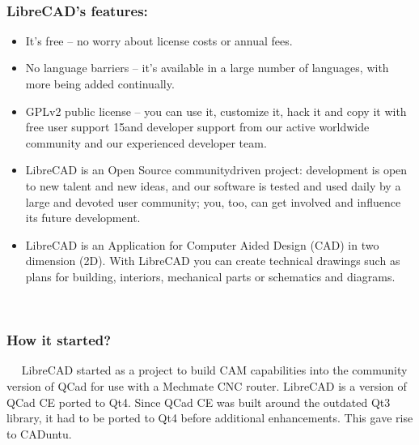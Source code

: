 \
\
\

\subsubsection{LibreCAD's features:}
\begin{itemize}
\item  It's free – no worry about license costs or annual fees.
\item No  language  barriers  –  it's  available  in  a  large  number  of  languages,  with  more  being  added
continually.
\item GPLv2  public  license  –  you  can  use  it,  customize  it,  hack  it  and  copy  it  with  free  user  support
15and  developer  support  from  our  active  worldwide  community  and  our  experienced  developer
team.
\item LibreCAD  is an Open Source community­driven project: development is open to new talent and
new  ideas,  and  our  software  is  tested  and  used  daily  by  a  large  and  devoted  user  community;
you, too, can get involved and influence its future development.
\item LibreCAD  is  an  Application  for  Computer  Aided  Design  (CAD)  in  two  dimension  (2D).  With
LibreCAD  you  can  create  technical  drawings  such  as  plans  for  building,  interiors,  mechanical
parts or schematics and diagrams.
\end{itemize}


\
\
\




\subsubsection{How it started?}
\
\
LibreCAD  started  as  a   project  to  build  CAM  capabilities  into  the  community  version  of  QCad  for  use with  a  Mechmate  CNC  router.  LibreCAD  is  a  version  of  QCad  CE  ported  to  Qt4.  Since  QCad  CE was  built  around  the  outdated  Qt3  library,  it  had  to  be  ported  to  Qt4  before  additional  enhancements. This gave rise to CADuntu.\\

